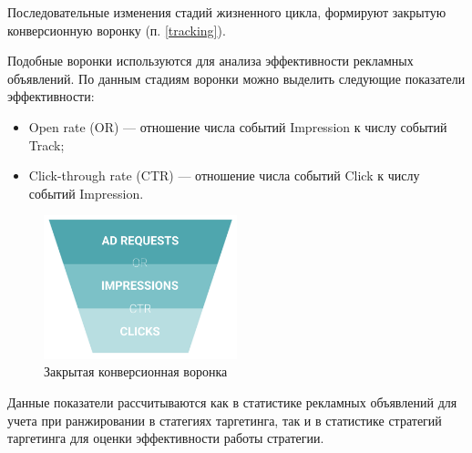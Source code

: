 \documentclass[specification,annotation,times]{itmo-student-thesis}
\begin{document}
Последовательные изменения стадий жизненного цикла, формируют закрытую конверсионную воронку (п. \ref{tracking}). 

Подобные воронки используются для анализа эффективности рекламных объявлений. По данным стадиям воронки можно выделить следующие показатели эффективности: 
\begin{itemize}
\item Open rate (OR) — отношение числа событий Impression к числу событий Track;
\item Click-through rate (CTR) — отношение числа событий Click к числу событий Impression.
\end{itemize}

\begin{figure}[h]
\caption{Закрытая конверсионная воронка}
\includegraphics[width=0.5\textwidth]{funnel}
\centering
\end{figure}

Данные показатели рассчитываются как в статистике рекламных объявлений для учета при ранжировании в статегиях таргетинга, так и в статистике стратегий таргетинга для оценки эффективности работы стратегии.

\end{document}
